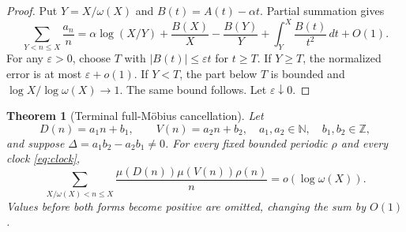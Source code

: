\documentclass[11pt]{article}
\newtheorem{theorem}{Theorem}[section]
\theoremstyle{definition}
\theoremstyle{remark}
\newcommand{\mob}{\mu}
\begin{document}
\begin{proof}
Put \(Y=X/\omega(X)\) and \(B(t)=A(t)-\alpha t\).  Partial summation gives
\[
 \sum_{Y<n\le X}\frac{a_n}{n}
 =\alpha\log(X/Y)+\frac{B(X)}X-\frac{B(Y)}Y
   +\int_Y^X\frac{B(t)}{t^2}\,dt+O(1).
\]
For any \(\varepsilon>0\), choose \(T\) with
\(|B(t)|\le\varepsilon t\) for \(t\ge T\).  If \(Y\ge T\), the normalized
error is at most \(\varepsilon+o(1)\).  If \(Y<T\), the part below \(T\)
is bounded and \(\log X/\log\omega(X)\to1\).  The same bound follows.
Let \(\varepsilon\downarrow0\).
\end{proof}

\begin{theorem}[Terminal full-M\"obius cancellation]
\label{thm:full-mu}
Let
\[
 D(n)=a_1n+b_1,\qquad V(n)=a_2n+b_2,
 \quad a_1,a_2\in\mathbb N,\quad b_1,b_2\in\mathbb Z,
\]
and suppose \(\Delta=a_1b_2-a_2b_1\ne0\).  For every fixed bounded
periodic \(\rho\) and every clock \eqref{eq:clock},
\begin{equation}
 \sum_{X/\omega(X)<n\le X}
 \frac{\mob(D(n))\mob(V(n))\rho(n)}n=o(\log\omega(X)).
 \label{eq:full-mu}
\end{equation}
Values before both forms become positive are omitted, changing the sum by
\(O(1)\).
\end{theorem}
\end{document}
